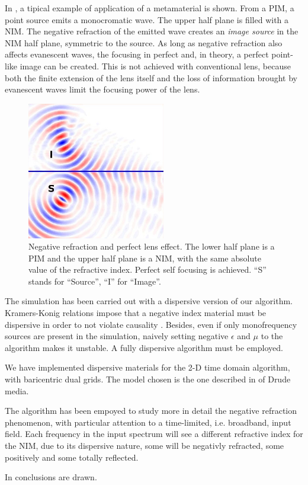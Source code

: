 In , a tipical example of application of a
metamaterial is shown. From a PIM, a point source emits a monocromatic
wave. The upper half plane is filled with a NIM. The negative
refraction of the emitted wave creates an \emph{image source} in the
NIM half plane, symmetric to the source. As long as negative
refraction also affects evanescent waves, the focusing in perfect and,
in theory, a perfect point-like image can be created. This is not
achieved with conventional lens, because both the finite extension of
the lens itself and the loss of information brought by evanescent
waves limit the focusing power of the lens. 

\begin{figure}[htbp]
  \begin{center}
    \includegraphics[height=6cm]{pics/nim_lens}
  \end{center}
  \caption{Negative refraction and perfect lens effect. The lower half
    plane is a PIM and the upper half plane is a NIM, with the same
    absolute value of the refractive index. Perfect self focusing is
    achieved. ``S'' stands for ``Source'', ``I'' for ``Image''.}
  \label{fig:nim_lens}
\end{figure}


The simulation has been carried out with a dispersive version of our
algorithm. Kramers-Konig relations impose that a negative index
material must be dispersive in order to not violate causality
\cite{jackson_classical}. Besides, even if only monofrequency sources
are present in the simulation, naively setting negative $\epsilon$
and $\mu$ to the algorithm makes it unstable. A fully dispersive
algorithm must be employed.


We have implemented dispersive materials for the 2-D time domain
algorithm, with baricentric dual grids. The model chosen is the one
described in \cite{taflove_computational} of Drude media.


The algorithm has been empoyed to study more in detail the negative
refraction phenomenon, with particular attention to a time-limited,
i.e. broadband, input field. Each frequency in the input spectrum will
see a different refractive index for the NIM, due to its dispersive
nature, some will be negativly refracted, some positively and some
totally reflected.

In \cite{bolla_energy} conclusions are drawn. 

